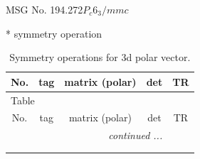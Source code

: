 \documentclass[fleqn,8pt]{jsarticle}
\begin{document}
\setcounter{MaxMatrixCols}{32}

\renewcommand{\tablename}{Table~}
\renewcommand{\figurename}{Figure~}
\begin{center}
\LARGE
MSG No. 194.272\quad$P_{c}6_{3}/mmc$
\end{center}
* symmetry operation
\renewcommand{\arraystretch}{1.3}
\begin{longtable}{ccccc}
\caption{Symmetry operations for 3d polar vector.}
 \\
 \hline \hline
No. & tag & matrix (polar) & det & TR \\ \hline \endfirsthead

\multicolumn{4}{l}{\tablename\ \thetable{}} \\
 \hline \hline
No. & tag & matrix (polar) & det & TR \\ \hline \endhead

 \hline \hline
\multicolumn{4}{r}{\footnotesize\it continued ...} \\ \endfoot

 \hline \hline
\multicolumn{4}{r}{} \\ \endlastfoot


\end{longtable}
\end{document}
